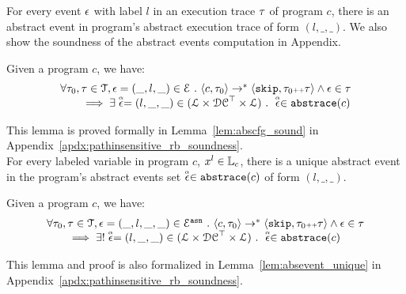    For every event $\mathtt{\epsilon}$ with label $l$ in an execution trace $\mathtt{\tau}$ of program $c$, 
   there is an abstract event in program's abstract execution trace of form $(l, \_, \_)$.  
   We also show the soundness of the abstract events computation in Appendix.
   \begin{lem}
     \label{lem:abscfg_sound}
   Given a program ${c}$, we have:
   \[
     \begin{array}{l}
       \forall \mathtt{\tau}_0, \mathtt{\tau} \in \mathcal{T} ,  \mathtt{\epsilon} = (\_, l, \_) \in \mathcal{E} ~.~
   \langle {c}, \mathtt{\tau}_0 \rangle \to^{*} \langle \mathtt{skip}, \mathtt{\tau}_0 {\scriptscriptstyle ++} \mathtt{\tau} \rangle 
   \land \mathtt{\epsilon} \in \mathtt{\tau} 
   \\
   \qquad \implies \exists \stackrel{\scriptscriptstyle{\alpha}}{\mathtt{\epsilon}{}} = (l, \_, \_) \in (\mathcal{L}\times \mathcal{DC}^{\top} \times \mathcal{L}) ~.~ 
   \stackrel{\scriptscriptstyle{\alpha}}{\mathtt{\epsilon}{}} \in \mathtt{abs}{\mathtt{trace}}(c)
   \end{array}
   \]
   \end{lem}
This lemma is proved formally in Lemma~\ref{lem:abscfg_sound} in Appendix~\ref{apdx:pathinsensitive_rb_soundness}.
\\
For every labeled variable in program $c$, $x^l \in \mathbb{L}_c$, 
there is a unique abstract event in the program's abstract events set $\stackrel{\scriptscriptstyle{\alpha}}{\mathtt{\epsilon}{}} \in \mathtt{abs}{\mathtt{trace}}(c)$ of form $(l, \_, \_)$. 
\begin{lem}
  \label{lem:abscfg_unique}
Given a program ${c}$, we have:
%
\[
  \begin{array}{l}
    \forall \mathtt{\tau}_0, \mathtt{\tau} \in \mathcal{T} ,  \mathtt{\epsilon} = (\_, l, \_, \_) \in \mathcal{E}^{\mathtt{{asn}}} ~.~
\langle {c}, \mathtt{\tau}_0 \rangle \to^{*} \langle \mathtt{skip}, \mathtt{\tau}_0 {\scriptscriptstyle ++} \mathtt{\tau} \rangle 
\land \mathtt{\epsilon} \in \mathtt{\tau} 
\\
\qquad \implies \exists! \stackrel{\scriptscriptstyle{\alpha}}{\mathtt{\epsilon}{}} = (l, \_, \_) \in (\mathcal{L}\times \mathcal{DC}^{\top} \times \mathcal{L}) ~.~ 
\stackrel{\scriptscriptstyle{\alpha}}{\mathtt{\epsilon}{}} \in \mathtt{abs}{\mathtt{trace}}(c)
\end{array}
\]
\end{lem}
This lemma and proof is also 
formalized in Lemma~\ref{lem:absevent_unique} in Appendix~\ref{apdx:pathinsensitive_rb_soundness}.

